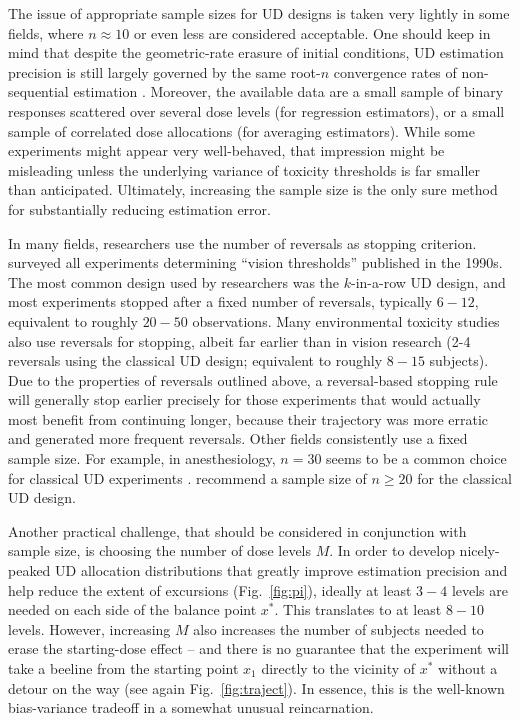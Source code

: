 The issue of appropriate sample sizes for UD designs is taken very lightly in some fields, where $n\approx 10$ or even less are considered acceptable. One should keep in mind that despite the geometric-rate erasure of initial conditions, UD estimation precision is still largely governed by the same root-$n$ convergence rates of non-sequential estimation \citep[Section~1.2]{Oron07} . Moreover, the available data are a small sample of binary responses scattered over several dose levels (for regression estimators), or a small sample of correlated dose allocations (for averaging estimators). While some experiments might appear very well-behaved, that impression might be misleading unless the underlying variance of toxicity thresholds is far smaller than anticipated. Ultimately, increasing the sample size is the only sure method for substantially reducing estimation error.

In many fields, researchers use the number of reversals  as stopping criterion. \cite{Garc:Pere:Forc:1998} surveyed all experiments determining ``vision thresholds'' published in the 1990s. The most common design used by researchers was the $k$-in-a-row UD design, and most experiments stopped after a fixed number of reversals, typically $6-12$, equivalent to roughly $20-50$ observations. Many environmental toxicity studies also use reversals for stopping, albeit far earlier than in vision research (2-4 reversals using the classical UD design; equivalent to roughly $8-15$ subjects). Due to the properties of reversals outlined above, a reversal-based stopping rule will generally stop earlier precisely for those experiments that would actually most benefit from continuing longer, because their trajectory was more erratic and generated more frequent reversals. Other fields consistently use a fixed sample size. For example, in anesthesiology, $n=30$ seems to be a common choice for classical UD experiments \citep{Capo:Parp:Lyon:Colu:Cell:Mini:2001,Camo:Capo:Lyon:Colu:Epid:2004}. \cite{Pace:styl:tutor:2007} recommend a sample size of $n\geq 20$ for the classical UD design.

Another practical challenge, that should be considered in conjunction with sample size, is choosing the number of dose levels $M$. In order to develop nicely-peaked UD allocation distributions that greatly improve estimation precision and help reduce the extent of excursions (Fig.~\ref{fig:pi}), ideally at least $3-4$ levels are needed on each side of the balance point $x^*$. This translates to at least $8-10$ levels. However, increasing $M$ also increases the number of subjects needed to erase the starting-dose effect -- and there is no guarantee that the experiment will take a beeline from the starting point $x_1$ directly to the vicinity of $x^*$ without a detour on the way (see again Fig.~\ref{fig:traject}).  In essence, this is the well-known bias-variance tradeoff in a somewhat unusual reincarnation.

